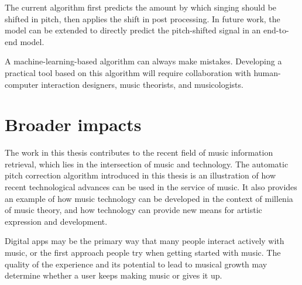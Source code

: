 The current algorithm first predicts the amount by which singing should be shifted in pitch, then applies the shift in post processing. In future work, the model can be extended to directly predict the pitch-shifted signal in an end-to-end model. 

A machine-learning-based algorithm can always make mistakes. Developing a practical tool based on this algorithm will require collaboration with human-computer interaction designers, music theorists, and musicologists.

\section{Broader impacts}
The work in this thesis contributes to the recent field of music information retrieval, which lies in the intersection of music and technology. The automatic pitch correction algorithm introduced in this thesis is an illustration of how recent technological advances can be used in the service of music. It also provides an example of how music technology can be developed in the context of millenia of music theory, and how technology can provide new means for artistic expression and development.

Digital apps may be the primary way that many people interact actively with music, or the first approach people try when getting started with music. The quality of the experience and its potential to lead to musical growth may determine whether a user keeps making music or gives it up.
